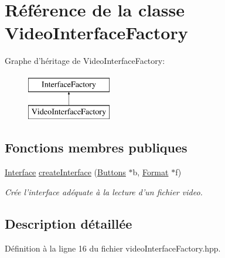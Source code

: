 \hypertarget{classVideoInterfaceFactory}{\section{Référence de la classe Video\+Interface\+Factory}
\label{classVideoInterfaceFactory}
}
Graphe d'héritage de Video\+Interface\+Factory\+:\begin{figure}[H]
\begin{center}
\leavevmode
\includegraphics[height=2.000000cm]{classVideoInterfaceFactory}
\end{center}
\end{figure}
\subsection*{Fonctions membres publiques}
\begin{DoxyCompactItemize}
\item 
\hyperlink{classInterface}{Interface} \hyperlink{classVideoInterfaceFactory_ac0470dfd9d2685893c62ec922496a9bf}{create\+Interface} (\hyperlink{classButtons}{Buttons} $\ast$b, \hyperlink{classFormat}{Format} $\ast$f)
\begin{DoxyCompactList}\small\item\em Crée l'interface adéquate à la lecture d'un fichier video. \end{DoxyCompactList}\end{DoxyCompactItemize}


\subsection{Description détaillée}


Définition à la ligne 16 du fichier video\+Interface\+Factory.\+hpp.



